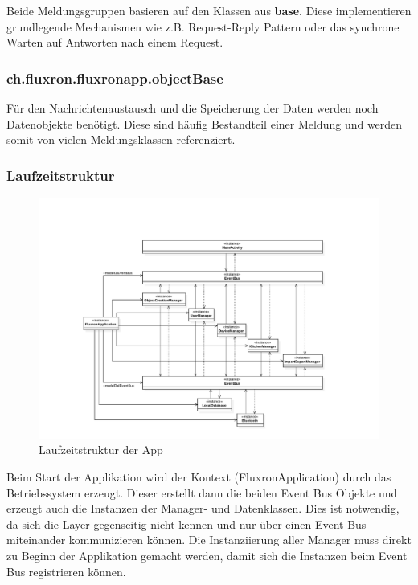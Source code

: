 Beide Meldungsgruppen basieren auf den Klassen aus \textbf{base}. Diese implementieren grundlegende Mechanismen wie z.B. Request-Reply Pattern oder das synchrone Warten auf Antworten nach einem Request.

\subsubsection{ch.fluxron.fluxronapp.objectBase}
Für den Nachrichtenaustausch und die Speicherung der Daten werden noch Datenobjekte benötigt. Diese sind häufig Bestandteil einer Meldung und werden somit von vielen Meldungsklassen referenziert.

\subsubsection{Laufzeitstruktur}
\begin{figure}[H]
    \begin{center}
        \includegraphics[trim=100 30 0 90,clip,scale=0.7]{results/res/instances}
    \end{center}
    \caption{Laufzeitstruktur der App}
    \label{abb:instances}
\end{figure}

Beim Start der Applikation wird der Kontext (FluxronApplication) durch das Betriebssystem  erzeugt. Dieser erstellt dann die beiden Event Bus Objekte und erzeugt auch die Instanzen der Manager- und Datenklassen. Dies ist notwendig, da sich die Layer gegenseitig nicht kennen und nur über einen Event Bus miteinander kommunizieren können. Die Instanziierung aller Manager muss direkt zu Beginn der Applikation gemacht werden, damit sich die Instanzen beim Event Bus registrieren können.

